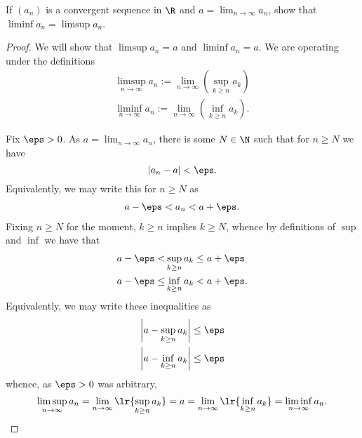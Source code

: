 \documentclass[12pt]{article}
\begin{document}
\begin{homeworkProblem}
If $ (a_{n}) $ is a convergent sequence in $ \R $ and $ a = \lim_{n\to\infty} a_{n} $, show that $ \liminf a_{n} = \limsup a_{n} $.
\begin{proof}
  We will show that $ \limsup a_{n} = a $ and $ \liminf a_{n} = a$. We are operating under the definitions
  \begin{align*}
    \limsup_{n\to \infty} a_{n} := \lim_{n\to \infty}\left(\sup_{k\geq n} a_{k}\right)\\
    \liminf_{n\to \infty} a_{n} := \lim_{n\to \infty}\left(\inf_{k\geq n} a_{k}\right).
  \end{align*}

  Fix $ \eps > 0 $. As $a = \lim_{n\to \infty} a_{n}$, there is some $ N\in \N $ such that for $ n\geq N $ we have 
  \[
    |a_{n}-a| < \eps.
  \]
  Equivalently, we may write this for $ n\geq N $ as 
  \begin{align*}
    a-\eps < a_{n} < a+ \eps.
  \end{align*}
  Fixing $ n\geq N $ for the moment, $ k\geq n $ implies $ k\geq N $, whence by definitions of $ \sup $ and $ \inf $ we have that
  \begin{align*}
    a-\eps < &\sup_{k\geq n} a_{k} \leq a+ \eps\\
    a-\eps \leq &\inf_{k\geq n} a_{k} < a+ \eps.
  \end{align*}
  Equivalently, we may write these inequalities as 
  \begin{align*}
    \left|a - \sup_{k\geq n} a_{k}\right| \leq \eps\\
    \left|a - \inf_{k\geq n} a_{k}\right| \leq \eps
  \end{align*}
  whence, as $ \eps>0 $ was arbitrary, $$\limsup_{n\to \infty} a_{n} = \lim_{n\to\infty}\lr{\sup_{k\geq n}a_{k}} = a = \lim_{n\to\infty }\lr{\inf_{k\geq n}a_{k}} = \liminf_{n\to\infty}a_{n}. $$

\end{proof}
\end{homeworkProblem}
\end{document}
